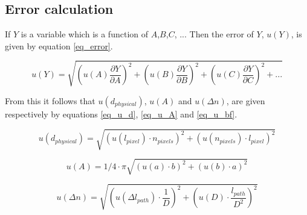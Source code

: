 \subsection{Error calculation}

If $Y$ is a variable which is a function of $A$,$B$,$C$, ... Then the error of $Y$, $u(Y)$, is given by equation \ref{eq_error}.

\begin{equation}
	\label{eq_error}
	u(Y) = \sqrt{\left(u(A) \frac{\partial Y}{\partial A}\right)^2 + \left(u(B) \frac{\partial Y}{\partial B}\right)^2 + \left(u(C) \frac{\partial Y}{\partial C}\right)^2 + ...}
\end{equation}

From this it follows that $u(d_{physical})$, $u(A)$ and $u(\Delta n)$, are given respectively by equations \ref{eq_u_d}, \ref{eq_u_A} and \ref{eq_u_bf}.

\begin{equation}
	\label{eq_u_distance}
	u(d_{physical}) = \sqrt{\left( u(l_{pixel}) \cdot n_{pixels} \right)^2 + \left( u(n_{pixels}) \cdot l_{pixel} \right)^2}
\end{equation}

\begin{equation}
	\label{eq_u_ellipse}
	u(A) = 1/4 \cdot \pi  \sqrt{(u(a) \cdot b)^2 + (u(b) \cdot a)^2}
\end{equation}

\begin{equation}
	\label{eq_u_bf}
	u(\Delta n) = \sqrt{\left( u(\Delta l_{path}) \cdot \frac{1}{D}\right)^2 + \left( u(D) \cdot \frac{l_{path}}{D^2}\right)^2}
\end{equation}

